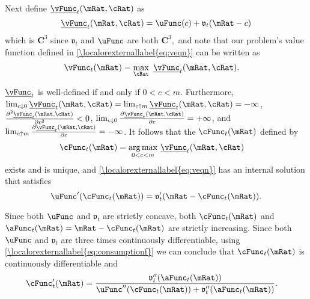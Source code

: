 \documentclass[\econtexRoot/BufferStockTheory]{subfiles}
\begin{document}
Next define $\underline{\vFunc}_{t}(\mRat,\cRat)$ as
\begin{equation}
\underline{\vFunc}_{t}(\mRat,\cRat)=\uFunc(c)+\mathfrak{v}_{t}(\mRat-c)
\end{equation}
which is $\mathbf{C}^{3}$ since $\mathfrak{v}_{t}$ and $\uFunc$ are both
$\mathbf{C}^{3},$ and note that our problem's value function defined
in \eqref{\localorexternallabel{eq:veqn}} can be written as
\begin{equation}\begin{gathered}\begin{aligned}
\vFunc_{t}(\mRat)  & =  \max_{\cRat}~\underline{\vFunc}_{t}(\mRat,\cRat).
\end{aligned}\end{gathered}\end{equation}

$\underline{\vFunc}_{t}$ is well-defined if and only if $0<c<m$.  Furthermore,
$\lim_{c \downarrow
  0}\underline{\vFunc}_{t}(\mRat,\cRat)=\lim_{c\uparrow m} \underline{\vFunc}_{t}(\mRat,\cRat)=-\infty $, $\frac{\partial ^{2}\underline{\vFunc}_{t}(\mRat,\cRat)}{\partial c^{2}}%
<0$, $\lim_{c \downarrow 0}\frac{\partial \underline{\vFunc}_{t}(\mRat,\cRat)}{\partial c}%
=+\infty $, and $\lim_{c\uparrow m} \frac{\partial \underline{\vFunc}_{t}(\mRat,\cRat)}{%
\partial c}=-\infty $. It follows that the $\cFunc_{t}(\mRat)$ defined by
\begin{equation}\begin{gathered}\begin{aligned}
\cFunc_{t}(\mRat)  & = \underset{0<c<m}{\arg \max }~\underline{\vFunc}_{t}(\mRat,\cRat)
\end{aligned}\end{gathered}\end{equation}
exists and is unique, and \eqref{\localorexternallabel{eq:veqn}} has an internal
solution that satisfies
\begin{equation}
\uFunc^{\prime }(\cFunc_{t}(\mRat))=\mathfrak{v}_{t}^{\prime }(\mRat-\cFunc_{t}(\mRat))  \label{eq:consumptionf}.
\end{equation}


Since both $\uFunc$ and $\mathfrak{v}_{t}$ are strictly concave, both
$\cFunc_{t}(\mRat)$ and $\aFunc_{t}(\mRat)=\mRat-\cFunc_{t}(\mRat)$
are strictly increasing. Since both $\uFunc$ and $\mathfrak{v}_{t}$ are
three times continuously differentiable, using \eqref{\localorexternallabel{eq:consumptionf}} we can conclude that
$\cFunc_{t}(\mRat)$ is continuously differentiable and
\begin{equation}\begin{gathered}\begin{aligned}
\cFunc_{t}^{\prime }(\mRat)  & = \frac{\mathfrak{v}_{t}^{\prime \prime }({\aFunc}_{t}(\mRat))  }{\uFunc^{\prime \prime }(\cFunc_{t}(\mRat))+\mathfrak{v}_{t}^{\prime \prime }({\aFunc}_{t}(\mRat))}.
\end{aligned}\end{gathered}\end{equation}
\end{document}
